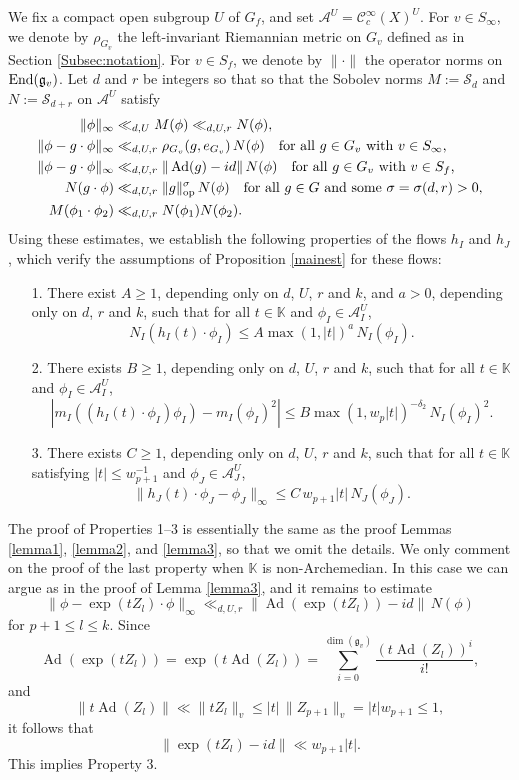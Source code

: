 \documentclass[11pt,reqno,a4paper]{amsart}
\numberwithin{equation}{section}
\newcommand{\cA}{\mathcal{A}}
\newcommand{\cC}{\mathcal{C}}
\newcommand{\cS}{\mathcal{S}}
\newcommand{\bK}{\mathbb{K}}
\newcommand{\gog}{\mathfrak{g}}
\DeclareMathOperator{\Ad}{Ad}
\theoremstyle{theorem}
\theoremstyle{definition}
\begin{document}
We fix a compact open subgroup $U$ of $G_f$, and set $\cA^U=\cC^\infty_c(X)^U$.
For $v\in S_\infty$, we denote by $\rho_{G_v}$ the left-invariant Riemannian metric on $G_v$
defined as in Section \ref{Subsec:notation}. 
For $v\in S_f$, we denote by $\|\cdot \|$ the operator norms on $\hbox{End}(\gog_v)$.
Let $d$ and $r$ be integers so that so that the Sobolev norms $M := \cS_{d}$ and $N := \cS_{d+r}$ on $\cA^U$ satisfy
\begin{align*}
\|\phi\|_\infty &\ll_{d,U} M(\phi)\ll_{d,U,r} N(\phi),  \\
\|\phi-g\cdot \phi\|_\infty &\ll_{d,U,r} \rho_{G_v}(g,e_{G_v}) \, N(\phi)\quad \hbox{for all $g \in G_v$ with $v\in S_\infty$,} \\
\|\phi-g\cdot \phi\|_\infty &\ll_{d,U,r} \|\Ad(g)-id\| \, N(\phi)\quad \hbox{for all $g \in G_v$ with $v\in S_f$,} \\
N(g \cdot \phi) &\ll_{d,U,r} \|g\|_{\rm op}^{\sigma}\, N(\phi)\quad\hbox{for all $g\in G$ and some $\sigma =\sigma(d,r)> 0$},\\
M(\phi_1 \cdot \phi_2) &\ll_{d,U,r} N(\phi_1) N(\phi_2).
\end{align*}
Using these estimates, we establish the following properties of the flows $h_I$ and $h_J$,
which verify the assumptions of Proposition \ref{mainest} for these flows:
\begin{enumerate}
	\item[1.] 
	There exist $A \geq 1$, depending only on $d$, $U$, $r$ and $k$, and $a > 0$,
	depending only on $d$, $r$ and $k$, such that for all $t \in \mathbb{K}$ and $\phi_I \in \cA_I^U$,
	$$
	N_I(h_I(t) \cdot \phi_I) \leq A \max(1,|t|)^a \, N_I(\phi_I).
	$$

	\item[2.] There exists $B \geq 1$, depending only on $d$, $U$, $r$  and $k$, such that for all $t\in \mathbb{K}$ and $\phi_I \in \cA_I^U$,
	$$
	|m_I((h_I(t) \cdot \phi_I) \phi_I) - m_I(\phi_I)^2| \leq B \max(1,w_p |t|)^{-\delta_2} \, N_I(\phi_I)^2.
	$$

	\item[3.] 
	There exists $C \geq 1$, depending only on $d$, $U$, $r$ and $k$, such that for all $t\in\mathbb{K}$ satisfying $|t|\le w_{p+1}^{-1}$ and $\phi_J \in \cA_J^U$,
	$$
	\|h_J(t) \cdot \phi_J - \phi_J\|_\infty \leq C\, w_{p+1} |t|  \, N_J(\phi_J).
	$$
\end{enumerate}

The proof of Properties 1--3 is essentially the same as the proof
 Lemmas \ref{lemma1}, \ref{lemma2}, and \ref{lemma3}, so that 
 we omit the details. We only comment on the proof of the last property when $\bK$ is non-Archemedian. In this case we can argue as in  the proof of Lemma \ref{lemma3},
 and it remains to estimate
 $$
 \|\phi-\exp(tZ_l)\cdot \phi\|_\infty \ll_{d,U,r} \|\Ad(\exp(tZ_l))-id\| \, N(\phi)
 $$
 for $p+1\le l\le k$. Since 
 $$
 \Ad(\exp(tZ_l))=\exp(t\Ad(Z_l))= \sum_{i=0}^{\dim(\gog_v)} \frac{(t\Ad(Z_l))^i}{i!},
 $$
 and 
 $$
 \|t\Ad(Z_l)\|\ll \|t Z_l\|_v \le |t|\,\|Z_{p+1}\|_v=|t| w_{p+1}\le 1,
 $$
 it follows that
 $$
 \|\exp(tZ_l)-id\|\ll w_{p+1} |t|.
 $$
 This implies Property 3.
 \\
 
\end{document}
